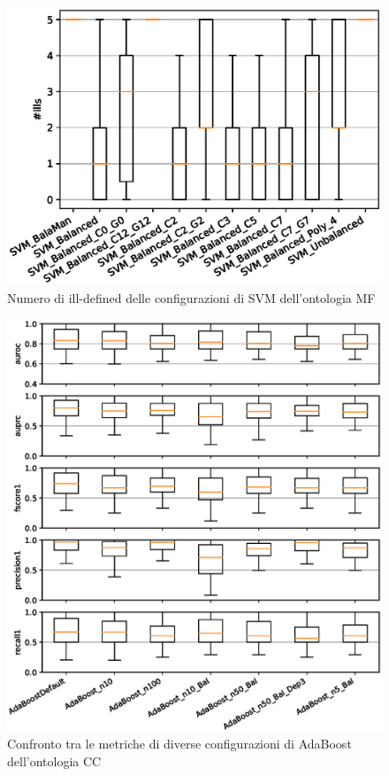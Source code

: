 \documentclass[12pt,a4paper,oneside,hidelinks]{report}
\begin{document}
\begin{figure}[hb]%
    \centering
    \includegraphics[scale = 0.80]{MF-SVM-ills.eps}%
    \caption{Numero di ill-defined delle configurazioni di SVM dell'ontologia MF}%
    \label{figure:ill14}%
\end{figure}

\vspace*{\fill}


\vspace*{\fill}

\begin{figure}[hb]%
    \centering
    \includegraphics[scale = 0.80]{CC-AdaBoost-level1.eps}%
    \caption{Confronto tra le metriche di diverse configurazioni di AdaBoost dell'ontologia CC}%
    \label{figure:liv1.1}%
\end{figure}
\end{document}
